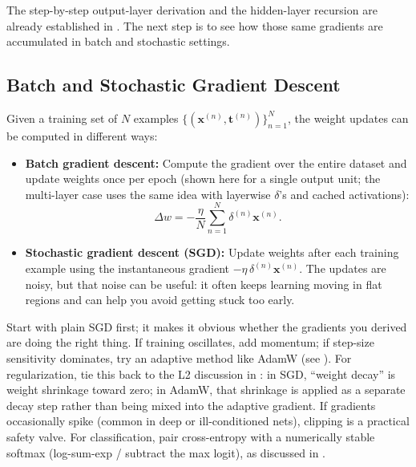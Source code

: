 The step-by-step output-layer derivation and the hidden-layer recursion are already established in . The next step is to see how those same gradients are accumulated in batch and stochastic settings.

\subsection{Batch and Stochastic Gradient Descent}
\label{sec:backprop_batch_and_stochastic_gradient_descent}

Given a training set of \( N \) examples \(\{(\mathbf{x}^{(n)}, \mathbf{t}^{(n)})\}_{n=1}^N\), the weight updates can be computed in different ways:

\begin{itemize}
    \item \textbf{Batch gradient descent:} Compute the gradient over the entire dataset and update weights once per epoch (shown here for a single output unit; the multi\hyp{}layer case uses the same idea with layerwise \(\delta\)'s and cached activations):
    \[
        \Delta w = -\frac{\eta}{N} \sum_{n=1}^N \delta^{(n)} \mathbf{x}^{(n)}.
    \]

    \item \textbf{Stochastic gradient descent (SGD):} Update weights after each training example using the instantaneous gradient \(-\eta \, \delta^{(n)} \mathbf{x}^{(n)}\). The updates are noisy, but that noise can be useful: it often keeps learning moving in flat regions and can help you avoid getting stuck too early.
\end{itemize}

\begin{tcolorbox}[summarybox, title={Optimizer and stability notes}]
Start with plain SGD first; it makes it obvious whether the gradients you derived are doing the right thing. If training oscillates, add momentum; if step-size sensitivity dominates, try an adaptive method like AdamW (see ). For regularization, tie this back to the L2 discussion in : in SGD, ``weight decay'' is weight shrinkage toward zero; in AdamW, that shrinkage is applied as a separate decay step rather than being mixed into the adaptive gradient. If gradients occasionally spike (common in deep or ill-conditioned nets), clipping is a practical safety valve. For classification, pair cross\hyp{}entropy with a numerically stable softmax (log\hyp{}sum\hyp{}exp / subtract the max logit), as discussed in .
\end{tcolorbox}

